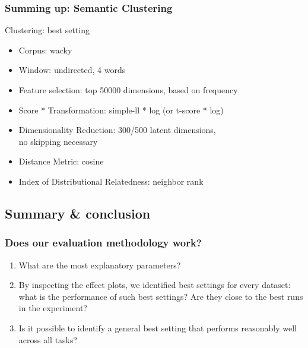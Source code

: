 \documentclass[t]{beamer} %
\begin{document}
\begin{frame}
\begin{columns}
\begin{column}{0.5\textwidth}
    \end{column}
  \end{columns}  
  
\end{frame}


\begin{frame}
  \frametitle{Summing up: Semantic Clustering}
  \begin{exampleblock}{Clustering: best setting}
    \begin{itemize}
    \item Corpus: wacky
    \item Window: undirected, 4 words 
    \item Feature selection: top 50000 dimensions, based on frequency
    \item Score * Transformation: simple-ll * log (or t-score * log)
    \item Dimensionality Reduction: 300/500 latent dimensions,\\ no skipping necessary
    \item Distance Metric: cosine
    \item Index of Distributional Relatedness: neighbor rank
    \end{itemize}
  \end{exampleblock}   
  
\end{frame}


\subsection{Summary \& conclusion}

\begin{frame}
  \frametitle{Does our evaluation methodology work?}

  \begin{enumerate}
  \item What are the most explanatory parameters?
  \item By inspecting the effect plots, we identified best settings for every dataset: what is the performance of such best settings? Are they close to the best runs in the experiment? 
  \item Is it possible to identify a general best setting that performs reasonably well across all tasks?
  \end{enumerate}
  
\end{frame}
\end{document}
